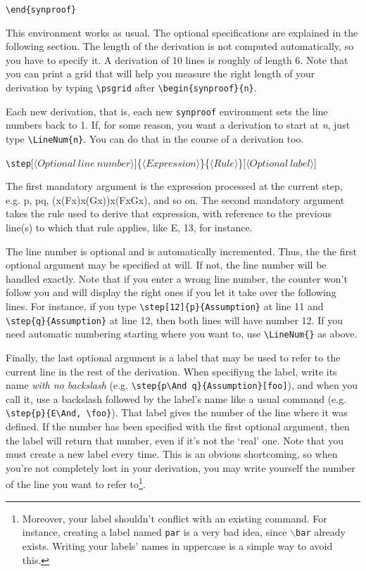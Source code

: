 \documentclass{article}
\begin{document}
\noindent\verb+\end{synproof}+

\noindent This environment works as usual. The optional specifications are explained in the following section. The length of the derivation is not computed automatically, so you have to specify it. A derivation of 10 lines is roughly of length 6. Note that you can print a grid that will help you measure the right length of your derivation by typing \verb+\psgrid+ after \verb+\begin{synproof}{n}+.

Each new derivation, that is, each new \verb+synproof+ environment sets the line numbers back to 1. If, for some reason, you want a derivation to start at \emph{n}, just type \verb+\LineNum{n}+. You can do that in the course of a derivation too.

\vspace{10pt}
\noindent\verb+\step+[$\langle Optional\ line\ number\rangle$]\{$\langle Expression\rangle$\}\{$\langle Rule\rangle$\}[$\langle Optional\ label\rangle$]

\noindent The first mandatory argument is the expression processed at the current step, e.g. p, p\And q, (\Exists x(Fx)\Implies\Exists x(Gx))\Implies\Exists x(Fx\Implies Gx), and so on. The second mandatory argument takes the rule used to derive that expression, with reference to the previous line(s) to which that rule applies, like E\And, 13, for instance. 

The line number is optional and is automatically incremented. Thus, the the first optional argument may be specified at will. If not, the line number will be handled exactly. Note that if you enter a wrong line number, the counter won't follow you and will display the right ones if you let it take over the following lines. For instance, if you type \verb+\step[12]{p}{Assumption}+ at line 11 and \verb+\step{q}{Assumption}+ at line 12, then both lines will have number 12. If you need automatic numbering starting where you want to, use \verb+\LineNum{}+ as above. 

Finally, the last optional argument is a label that may be used to refer to the current line in the rest of the derivation. When specifiyng the label, write its name \emph{with no backslash} (e.g. \verb+\step{p\And q}{Assumption}[foo]+), and when you call it, use a backslash followed by the label's name like a usual command (e.g. \verb+\step{p}{E\And, \foo}+). That label gives the number of the line where it was defined. If the number has been specified with the first optional argument, then the label will return that number, even if it's not the `real' one. Note that you must create a new label every time. This is an obvious shortcoming, so when you're not completely lost in your derivation, you may write yourself the number of the line you want to refer to\footnote{Moreover, your label shouldn't conflict with an existing command. For instance, creating a label named \texttt{par} is a very bad idea, since $\backslash$\texttt{bar} already exists. Writing your labels' names in uppercase is a simple way to avoid this.}.
\end{document}
